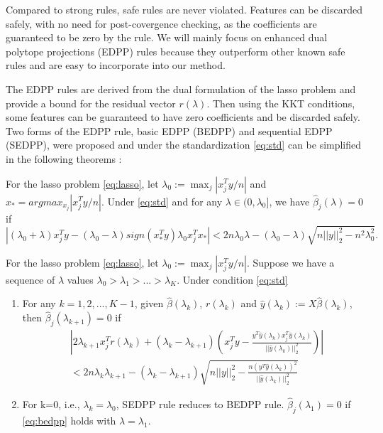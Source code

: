 Compared to strong rules, safe rules are never violated. Features can be discarded safely, with no need for post-covergence checking, as the coefficients are guaranteed to be zero by the rule. We will mainly focus on enhanced dual polytope projections (EDPP) rules\citep{wang2013lasso} because they outperform other known safe rules and are easy to incorporate into our method.

The EDPP rules are derived from the dual formulation of the lasso problem and provide a bound for the residual vector $r(\lambda)$. Then using the KKT conditions, some features can be guaranteed to have zero coefficients and be discarded safely. Two forms of the EDPP rule, basic EDPP (BEDPP) and sequential EDPP (SEDPP)\citep{wang2013lasso}, were proposed and under the standardization \eqref{eq:std} can be simplified in the following theorems \citep{Zeng2021}:

\begin{theorem}[BEDPP]
    For the lasso problem \eqref{eq:lasso}, let $\lambda_0:=\max_j|x_j^Ty/n|$ and $x_*=argmax_{x_j}|x_j^Ty/n|$. Under \eqref{eq:std} and for any $\lambda\in(0,\lambda_0]$, we have $\hat{\beta}_j(\lambda)=0$ if
    \begin{equation}
        \label{eq:bedpp}
        |(\lambda_0+\lambda)x_j^Ty-(\lambda_0-\lambda)sign(x_*^Ty)\lambda_0x_j^Tx_*|<2n\lambda_0\lambda-(\lambda_0-\lambda)\sqrt{n||y||_2^2-n^2\lambda_0^2}.
    \end{equation}
\end{theorem}

\begin{theorem}[SEDPP]
    For the lasso problem \eqref{eq:lasso}, let $\lambda_0:=\max_j|x_j^Ty/n|$. Suppose we have a sequence of $\lambda$ values $\lambda_0>\lambda_1>...>\lambda_K$. Under condition \eqref{eq:std}
    \begin{enumerate}
        \item For any $k=1,2,...,K-1$, given $\hat{\beta}(\lambda_k)$, $r(\lambda_k)$ and $\hat{y}(\lambda_k):=X\hat{\beta}(\lambda_k)$, then $\hat{\beta}_j(\lambda_{k+1})=0$ if
        \begin{equation}
            \label{eq:sedpp}
            \begin{split}
                &\left|2\lambda_{k+1}x_j^Tr(\lambda_k)+(\lambda_k-\lambda_{k+1})\left( x_j^Ty-\frac{y^T\hat{y}(\lambda_k)x_j^T\hat{y}(\lambda_k)}{||\hat{y}(\lambda_k)||_2^2}\right)\right|\\&<2n\lambda_k\lambda_{k+1}-(\lambda_k-\lambda_{k+1})\sqrt{n||y||_2^2-\frac{n(y^T\hat{y}(\lambda_k))^2}{||\hat{y}(\lambda_k)||_2^2}}
            \end{split}
        \end{equation}
        \item For k=0, i.e., $\lambda_k=\lambda_0$, SEDPP rule reduces to BEDPP rule. $\hat{\beta}_j(\lambda_1)=0$ if \eqref{eq:bedpp} holds with $\lambda=\lambda_1$.
    \end{enumerate}
\end{theorem}

